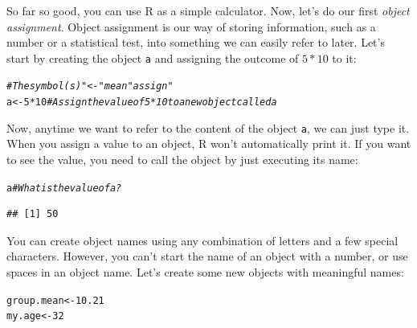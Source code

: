 \documentclass{tufte-book}\usepackage[]{graphicx}\usepackage[]{color}
\makeatletter
\newcommand{\hlnum}[1]{\textcolor[rgb]{0.686,0.059,0.569}{#1}}%
\newcommand{\hlcom}[1]{\textcolor[rgb]{0.678,0.584,0.686}{\textit{#1}}}%
\newcommand{\hlopt}[1]{\textcolor[rgb]{0,0,0}{#1}}%
\newcommand{\hlstd}[1]{\textcolor[rgb]{0.345,0.345,0.345}{#1}}%
\newcommand{\hlkwb}[1]{\textcolor[rgb]{0.69,0.353,0.396}{#1}}%
\newenvironment{kframe}{%
 \def\at@end@of@kframe{}%
 \ifinner\ifhmode%
  \def\at@end@of@kframe{\end{minipage}}%
  \begin{minipage}{\columnwidth}%
 \fi\fi%
 \def\FrameCommand##1{\hskip\@totalleftmargin \hskip-\fboxsep
 \colorbox{shadecolor}{##1}\hskip-\fboxsep
     \hskip-\linewidth \hskip-\@totalleftmargin \hskip\columnwidth}%
 \MakeFramed {\advance\hsize-\width
   \@totalleftmargin\z@ \linewidth\hsize
   \@setminipage}}%
 {\par\unskip\endMakeFramed%
 \at@end@of@kframe}
\newenvironment{knitrout}{}{} %
\makeatother
\begin{document}
So far so good, you can use R as a simple calculator. Now, let's do our first \textit{object assignment}. Object assignment is our way of storing information, such as a number or a statistical test, into something we can easily refer to later. Let's start by creating the object \texttt{a} and assigning the outcome of $5*10$ to it:


\begin{knitrout}
\color{fgcolor}\begin{kframe}
\begin{alltt}
\hlcom{# The symbol(s) "<-" mean "assign"}
\hlstd{a} \hlkwb{<-} \hlnum{5} \hlopt{*} \hlnum{10} \hlcom{# Assign the value of 5*10 to a new object called a}
\end{alltt}
\end{kframe}
\end{knitrout}

Now, anytime we want to refer to the content of the object \texttt{a}, we can just type it. When you assign a value to an object, R won't automatically print it. If you want to see the value, you need to call the object by just executing its name:


\begin{knitrout}
\color{fgcolor}\begin{kframe}
\begin{alltt}
\hlstd{a} \hlcom{# What is the value of a?}
\end{alltt}
\begin{verbatim}
## [1] 50
\end{verbatim}
\end{kframe}
\end{knitrout}

You can create object names using any combination of letters and a few special characters. However, you can't start the name of an object with a number, or use spaces in an object name. Let's create some new objects with meaningful names:

\begin{knitrout}
\color{fgcolor}\begin{kframe}
\begin{alltt}
\hlstd{group.mean} \hlkwb{<-} \hlnum{10.21}
\hlstd{my.age} \hlkwb{<-} \hlnum{32}
\end{alltt}
\end{kframe}
\end{knitrout}
\end{document}
